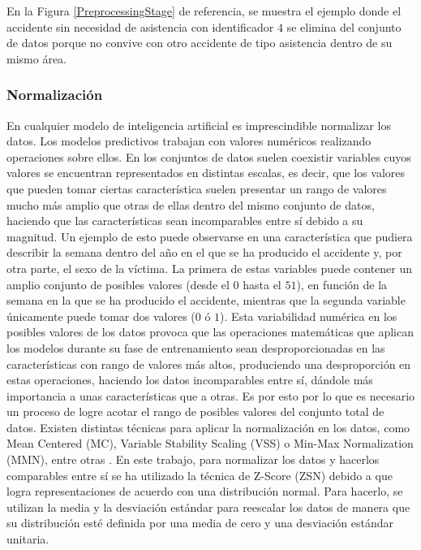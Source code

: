 \documentclass{uathesis-es}
\begin{document}
	En la Figura \ref{PreprocessingStage} de referencia, se muestra el ejemplo donde el accidente sin necesidad de asistencia con identificador $4$ se elimina del conjunto de datos porque no convive con otro accidente de tipo asistencia dentro de su mismo área.
	
	
	\subsubsection{Normalización}
	
	En cualquier modelo de inteligencia artificial es imprescindible normalizar los datos. Los modelos predictivos trabajan con valores numéricos realizando operaciones sobre ellos. En los conjuntos de datos suelen coexistir variables cuyos valores se encuentran representados en distintas escalas, es decir, que los valores que pueden tomar ciertas característica suelen presentar un rango de valores mucho más amplio que otras de ellas dentro del mismo conjunto de datos, haciendo que las características sean incomparables entre sí debido a su magnitud. Un ejemplo de esto puede observarse en una característica que pudiera describir la semana dentro del año en el que se ha producido el accidente y, por otra parte, el sexo de la víctima. La primera de estas variables puede contener un amplio conjunto de posibles valores (desde el $0$ hasta el $51$), en función de la semana en la que se ha producido el accidente, mientras que la segunda variable únicamente puede tomar dos valores ($0$ ó $1$). Esta variabilidad numérica en los posibles valores de los datos provoca que las operaciones matemáticas que aplican los modelos durante su fase de entrenamiento sean desproporcionadas en las características con rango de valores más altos, produciendo una desproporción en estas operaciones, haciendo los datos incomparables entre sí, dándole más importancia a unas características que a otras. Es por esto por lo que es necesario un proceso de logre acotar el rango de posibles valores del conjunto total de datos. Existen distintas técnicas para aplicar la normalización en los datos, como Mean Centered (MC), Variable Stability Scaling (VSS) o Min-Max Normalization (MMN), entre otras \cite{DataNormalizationInvestigation}. En este trabajo, para normalizar los datos y hacerlos comparables entre sí se ha utilizado la técnica de Z-Score (ZSN) debido a que logra representaciones de acuerdo con una distribución normal. Para hacerlo, se utilizan la media y la desviación estándar para reescalar los datos de manera que su distribución esté definida por una media de cero y una desviación estándar unitaria.
	
\end{document}
